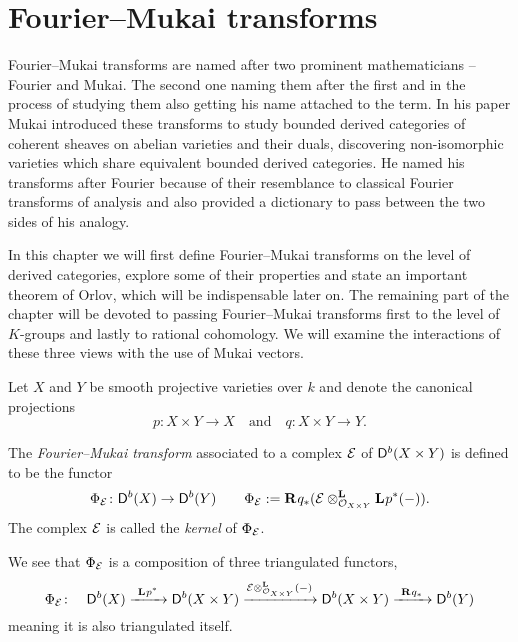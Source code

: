 \section{Fourier--Mukai transforms}
\label{Chapter: Fourier-Mukai transforms}

Fourier--Mukai transforms are named after two prominent mathematicians -- Fourier and Mukai. The second one naming them after the first and in the process of studying them also getting his name attached to the term. In his paper \cite{Mukai1981} Mukai introduced these transforms to study bounded derived categories of coherent sheaves on abelian varieties and their duals, discovering non-isomorphic varieties which share equivalent bounded derived categories. He named his transforms after Fourier because of their resemblance to classical Fourier transforms of analysis and also provided a dictionary to pass between the two sides of his analogy.

In this chapter we will first define Fourier--Mukai transforms on the level of derived categories, explore some of their properties and state an important theorem of Orlov, which will be indispensable later on. The remaining part of the chapter will be devoted to passing Fourier--Mukai transforms first to the level of $K$-groups and lastly to rational cohomology. We will examine the interactions of these three views with the use of Mukai vectors.

\vspace{0.3cm}
\noindent
Let $X$ and $Y$ be smooth projective varieties over $k$ and denote the canonical projections 
\[
    p \colon X \times Y \to X \quad \text{and} \quad q \colon X \times Y \to Y.
\]

\begin{definition}
    The \emph{Fourier--Mukai transform} associated to a complex $\E$ of $\derb{X \times Y}$ is defined to be the functor
    \[
        \fm{\E} \colon \derb{X} \to \derb{Y} \qquad \fm{\E} := \rderived{}{q_*}(\derivedtensor{\E}{\lderived{}{p^*}(-)}{\struct{X \times Y}}).
    \]
    The complex $\E$ is called the \emph{kernel} of $\fm{\E}$.
\end{definition}

\begin{remark}
    We see that $\fm{\E}$ is a composition of three triangulated functors,
    \[
        \fm{\E} \colon \quad \derb{X} \xrightarrow{\ \lderived{}{p^*} \ } \derb{X \times Y} \xrightarrow{\derivedtensor{\E}{(-)}{\struct{X \times Y}}} \derb{X \times Y} \xrightarrow{\ \rderived{}{q_*} \ } \derb{Y}
    \]
    meaning it is also triangulated itself.  
\end{remark}

